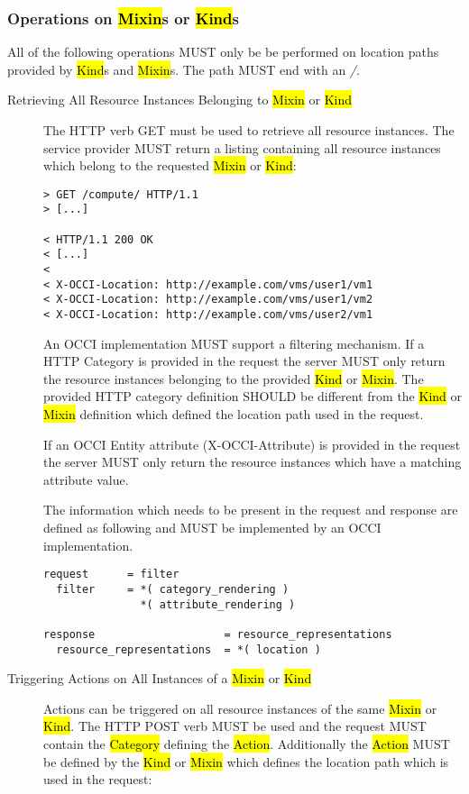 \documentclass[10pt,a4paper]{article}
\begin{document}
\subsubsection{Operations on \hl{Mixin}s or \hl{Kind}s}
All of the following operations MUST only be be performed on location
paths provided by \hl{Kind}s and \hl{Mixin}s. The path MUST end with
an \emph{/}.

\begin{description}
  \item[Retrieving All Resource Instances Belonging to \hl{Mixin} or
    \hl{Kind}] The HTTP verb GET must be used to retrieve all resource
    instances. The service provider MUST return a listing containing
    all resource instances which belong to the requested \hl{Mixin} or
    \hl{Kind}:

\begin{verbatim}
> GET /compute/ HTTP/1.1
> [...]
 
< HTTP/1.1 200 OK
< [...]
< 
< X-OCCI-Location: http://example.com/vms/user1/vm1
< X-OCCI-Location: http://example.com/vms/user1/vm2
< X-OCCI-Location: http://example.com/vms/user2/vm1
\end{verbatim}

    An OCCI implementation MUST support a filtering mechanism. If a
    HTTP Category is provided in the request the server MUST only
    return the resource instances belonging to the provided \hl{Kind}
    or \hl{Mixin}. The provided HTTP category definition SHOULD be
    different from the \hl{Kind} or \hl{Mixin} definition which
    defined the location path used in the request.

    If an OCCI Entity attribute (X-OCCI-Attribute) is provided in the
    request the server MUST only return the resource instances which
    have a matching attribute value.

    The information which needs to be present in the request and
    response are defined as following and MUST be implemented by an
    OCCI implementation.

\begin{verbatim}
request      = filter
  filter     = *( category_rendering )
               *( attribute_rendering )

response                    = resource_representations
  resource_representations  = *( location ) 
\end{verbatim}

  \item[Triggering Actions on All Instances of a \hl{Mixin} or
    \hl{Kind}] Actions can be triggered on all resource instances of
    the same \hl{Mixin} or \hl{Kind}. The HTTP POST verb MUST be used
    and the request MUST contain the \hl{Category} defining the
    \hl{Action}.  Additionally the \hl{Action} MUST be defined by the
    \hl{Kind} or \hl{Mixin} which defines the location path which is
    used in the request:


\end{description}
\end{document}
